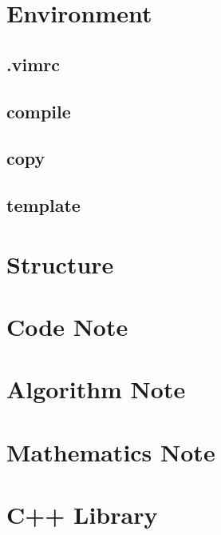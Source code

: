 \documentclass[a4paper, landscape, 8pt]{article}
\begin{document}
\begin{multicols*}{3}
\maketitle
\tableofcontents

\section{Environment}
\subsection{.vimrc}

\subsection{compile}

\subsection{copy}

\subsection{template}


\section{Structure}


\section{Code Note}


\section{Algorithm Note}

\section{Mathematics Note}


\section{C++ Library}



\end{multicols*}
\end{document}
